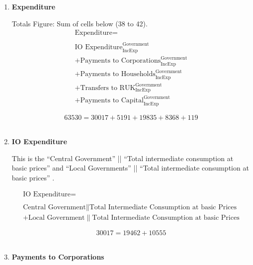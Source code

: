\begin{enumerate}
\pagebreak

\item \textbf {Expenditure}

Totals Figure: Sum of cells below (38 to 42).\\

\begin{equation}
\begin{split}
\text{Expenditure} =  \\ \\
\text{IO Expenditure}^\text{Government}_\text{IncExp}\\
+\text{Payments to Corporations}^\text{Government}_\text{IncExp}\\
+\text{Payments to Households}^\text{Government}_\text{IncExp}\\
+\text{Transfers to RUK}^\text{Government}_\text{IncExp}\\
+\text{Payments to Capital}^\text{Government}_\text{IncExp}
\end{split} \label{eq:2.5.41}
\end{equation}

\begin{equation} \nonumber
63530 = 30017+5191+19835+8368+119
\end{equation}\\


\item \textbf {IO Expenditure}

This is the ``Central Government'' || ``Total intermediate consumption at basic prices'' and ``Local Governments'' || ``Total intermediate consumption at basic prices'' \cite{ScotGov2013a}.

\begin{equation}
\begin{split}
\text{IO Expenditure} =  \\ \\
\text{Central Government}\|\text{Total Intermediate Consumption at basic Prices}\\
+\text{Local Government}\|\text{Total Intermediate Consumption at basic Prices}
\end{split} \label{eq:2.5.42}
\end{equation}

\begin{equation} \nonumber
30017 = 19462+10555
\end{equation}\\


\item \textbf {Payments to  Corporations}


\end{enumerate}
